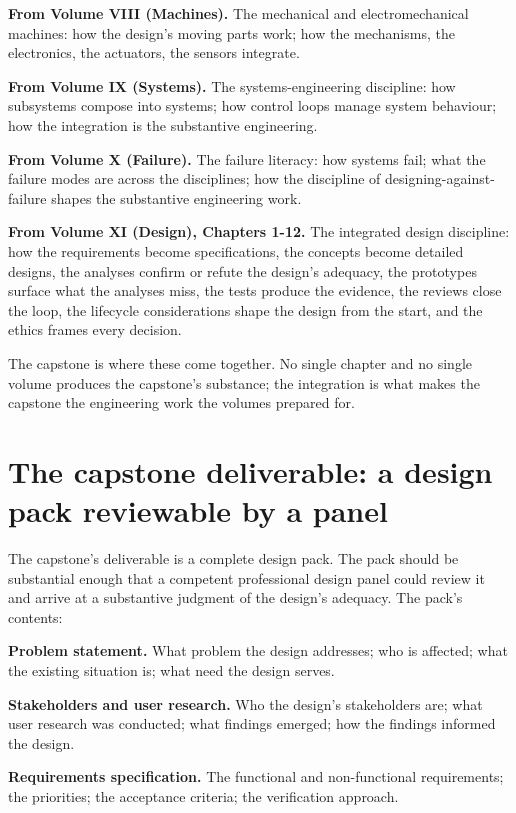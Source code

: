 \textbf{From Volume VIII (Machines).} The mechanical and electromechanical machines: how the design's moving parts work; how the mechanisms, the electronics, the actuators, the sensors integrate.

\textbf{From Volume IX (Systems).} The systems-engineering discipline: how subsystems compose into systems; how control loops manage system behaviour; how the integration is the substantive engineering.

\textbf{From Volume X (Failure).} The failure literacy: how systems fail; what the failure modes are across the disciplines; how the discipline of designing-against-failure shapes the substantive engineering work.

\textbf{From Volume XI (Design), Chapters 1-12.} The integrated design discipline: how the requirements become specifications, the concepts become detailed designs, the analyses confirm or refute the design's adequacy, the prototypes surface what the analyses miss, the tests produce the evidence, the reviews close the loop, the lifecycle considerations shape the design from the start, and the ethics frames every decision.

The capstone is where these come together. No single chapter and no single volume produces the capstone's substance; the integration is what makes the capstone the engineering work the volumes prepared for.

\section{The capstone deliverable: a design pack reviewable by a panel}

The capstone's deliverable is a complete design pack. The pack should be substantial enough that a competent professional design panel could review it and arrive at a substantive judgment of the design's adequacy. The pack's contents:

\textbf{Problem statement.} What problem the design addresses; who is affected; what the existing situation is; what need the design serves.

\textbf{Stakeholders and user research.} Who the design's stakeholders are; what user research was conducted; what findings emerged; how the findings informed the design.

\textbf{Requirements specification.} The functional and non-functional requirements; the priorities; the acceptance criteria; the verification approach.

